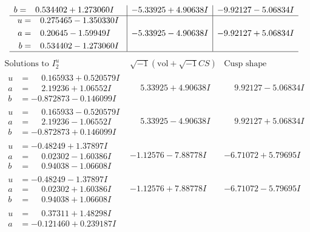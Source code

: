 \documentclass[1p]{elsarticle_modified}
\theoremstyle{definition}
\newcommand{\I}{\sqrt{-1}}
\begin{document}
$$\begin{array}{c|c|c}
\begin{aligned}
b &= \phantom{-}0.534402 + 1.273060 I\end{aligned}
 & -5.33925 + 4.90638 I & -9.92127 - 5.06834 I \\ \hline\begin{aligned}
u &= \phantom{-}0.275465 - 1.350330 I \\
a &= \phantom{-}0.20645 - 1.59949 I \\
b &= \phantom{-}0.534402 - 1.273060 I\end{aligned}
 & -5.33925 - 4.90638 I & -9.92127 + 5.06834 I\\
 \hline 
 \end{array}$$\newpage$$\begin{array}{c|c|c}  
\text{Solutions to }I^u_{2}& \I (\text{vol} + \sqrt{-1}CS) & \text{Cusp shape}\\
 \hline 
\begin{aligned}
u &= \phantom{-}0.165933 + 0.520579 I \\
a &= \phantom{-}2.19236 + 1.06552 I \\
b &= -0.872873 - 0.146099 I\end{aligned}
 & \phantom{-}5.33925 + 4.90638 I & \phantom{-}9.92127 - 5.06834 I \\ \hline\begin{aligned}
u &= \phantom{-}0.165933 - 0.520579 I \\
a &= \phantom{-}2.19236 - 1.06552 I \\
b &= -0.872873 + 0.146099 I\end{aligned}
 & \phantom{-}5.33925 - 4.90638 I & \phantom{-}9.92127 + 5.06834 I \\ \hline\begin{aligned}
u &= -0.48249 + 1.37897 I \\
a &= \phantom{-}0.02302 - 1.60386 I \\
b &= \phantom{-}0.94038 - 1.06608 I\end{aligned}
 & -1.12576 - 7.88778 I & -6.71072 + 5.79695 I \\ \hline\begin{aligned}
u &= -0.48249 - 1.37897 I \\
a &= \phantom{-}0.02302 + 1.60386 I \\
b &= \phantom{-}0.94038 + 1.06608 I\end{aligned}
 & -1.12576 + 7.88778 I & -6.71072 - 5.79695 I \\ \hline\begin{aligned}
u &= \phantom{-}0.37311 + 1.48298 I \\
a &= -0.121460 + 0.239187 I \\

\end{aligned}
\end{array}$$
\end{document}

